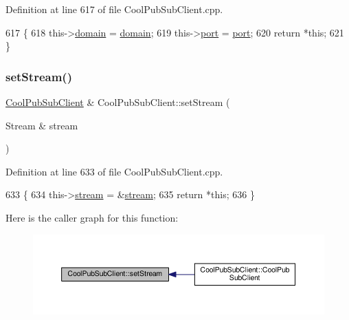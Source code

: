 Definition at line 617 of file Cool\+Pub\+Sub\+Client.\+cpp.


\begin{DoxyCode}
617                                                                                 \{
618     this->\hyperlink{class_cool_pub_sub_client_a08d3a5619724f3408ad406ca4fb776e1}{domain} = \hyperlink{class_cool_pub_sub_client_a08d3a5619724f3408ad406ca4fb776e1}{domain};
619     this->\hyperlink{class_cool_pub_sub_client_a01e3249102c057756af7a515c179844e}{port} = \hyperlink{class_cool_pub_sub_client_a01e3249102c057756af7a515c179844e}{port};
620     \textcolor{keywordflow}{return} *\textcolor{keyword}{this};
621 \}
\end{DoxyCode}
\mbox{\label{class_cool_pub_sub_client_ae97e40823ea689ff9e36d5bdd71bb933}} 
\subsubsection{\texorpdfstring{set\+Stream()}{setStream()}}
{\footnotesize\ttfamily \hyperlink{class_cool_pub_sub_client}{Cool\+Pub\+Sub\+Client} \& Cool\+Pub\+Sub\+Client\+::set\+Stream (\begin{DoxyParamCaption}\item[{Stream \&}]{stream }\end{DoxyParamCaption})}



Definition at line 633 of file Cool\+Pub\+Sub\+Client.\+cpp.


\begin{DoxyCode}
633                                                            \{
634     this->\hyperlink{class_cool_pub_sub_client_a7a92417b317e7bd9502ed37752111705}{stream} = &\hyperlink{class_cool_pub_sub_client_a7a92417b317e7bd9502ed37752111705}{stream};
635     \textcolor{keywordflow}{return} *\textcolor{keyword}{this};
636 \}
\end{DoxyCode}
Here is the caller graph for this function\+:\nopagebreak
\begin{figure}[H]
\begin{center}
\leavevmode
\includegraphics[width=350pt]{d8/d4b/class_cool_pub_sub_client_ae97e40823ea689ff9e36d5bdd71bb933_icgraph}
\end{center}
\end{figure}
\mbox{\label{class_cool_pub_sub_client_a2276c7e52531b597b4342fadf3722f43}} 
